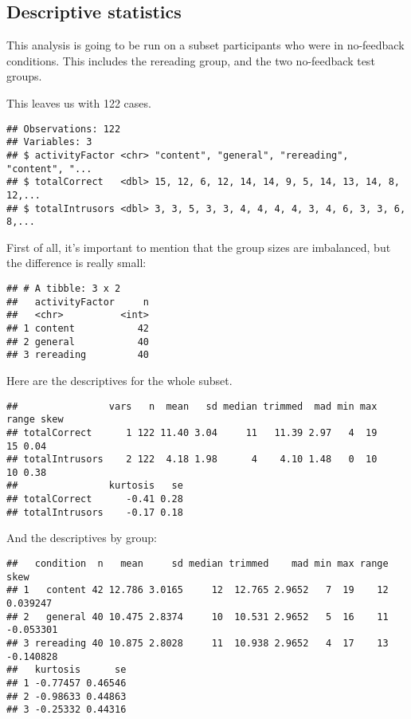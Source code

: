 \documentclass[12pt,]{article}
\begin{document}
\hypertarget{descriptive-statistics}{%
\subsection{Descriptive statistics}\label{descriptive-statistics}}

This analysis is going to be run on a subset participants who were in
no-feedback conditions. This includes the rereading group, and the two
no-feedback test groups.

This leaves us with 122 cases.

\begin{verbatim}
## Observations: 122
## Variables: 3
## $ activityFactor <chr> "content", "general", "rereading", "content", "...
## $ totalCorrect   <dbl> 15, 12, 6, 12, 14, 14, 9, 5, 14, 13, 14, 8, 12,...
## $ totalIntrusors <dbl> 3, 3, 5, 3, 3, 4, 4, 4, 4, 3, 4, 6, 3, 3, 6, 8,...
\end{verbatim}

First of all, it's important to mention that the group sizes are
imbalanced, but the difference is really small:

\begin{verbatim}
## # A tibble: 3 x 2
##   activityFactor     n
##   <chr>          <int>
## 1 content           42
## 2 general           40
## 3 rereading         40
\end{verbatim}

Here are the descriptives for the whole subset.

\begin{verbatim}
##                vars   n  mean   sd median trimmed  mad min max range skew
## totalCorrect      1 122 11.40 3.04     11   11.39 2.97   4  19    15 0.04
## totalIntrusors    2 122  4.18 1.98      4    4.10 1.48   0  10    10 0.38
##                kurtosis   se
## totalCorrect      -0.41 0.28
## totalIntrusors    -0.17 0.18
\end{verbatim}

And the descriptives by group:

\begin{verbatim}
##   condition  n   mean     sd median trimmed    mad min max range      skew
## 1   content 42 12.786 3.0165     12  12.765 2.9652   7  19    12  0.039247
## 2   general 40 10.475 2.8374     10  10.531 2.9652   5  16    11 -0.053301
## 3 rereading 40 10.875 2.8028     11  10.938 2.9652   4  17    13 -0.140828
##   kurtosis      se
## 1 -0.77457 0.46546
## 2 -0.98633 0.44863
## 3 -0.25332 0.44316
\end{verbatim}
\end{document}
